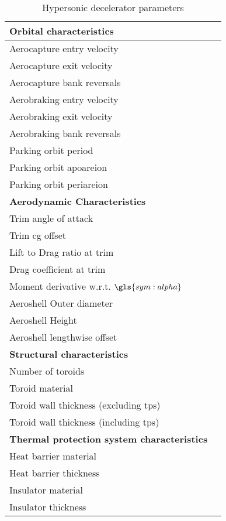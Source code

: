 \begin{table}
	\centering
	\caption{Hypersonic decelerator parameters}
	\label{tab:DeceleratorPar}
	\begin{tabular}{|l|l|} \hline
		\textbf{Orbital characteristics}             	& 			\\ \hline \hline
		Aerocapture entry velocity       				&	  		\\ \hline
		Aerocapture exit velocity				 		&     	  	\\ \hline
		Aerocapture bank reversals				        &  	   		\\ \hline
		Aerobraking entry velocity					 	&  			\\ \hline
		Aerobraking exit velocity					 	&  			\\ \hline
		Aerobraking bank reversals					 	&  			\\ \hline
		Parking orbit period						 	&  			\\ \hline
		Parking orbit apoareion			 				&  			\\ \hline
		Parking orbit periareion			 			&  			\\ \hline
		\textbf{Aerodynamic Characteristics}			&			\\ \hline \hline
		Trim angle of attack				 			&  			\\ \hline
		Trim \gls{cg} offset							&			\\ \hline
		Lift to Drag ratio at trim			 			&  			\\ \hline
		Drag coefficient at trim			 			&  			\\ \hline
		Moment derivative w.r.t. $\gls{sym:alpha}$		&  			\\ \hline
		Aeroshell Outer diameter						&  			\\ \hline
		Aeroshell Height								&  			\\ \hline
		Aeroshell lengthwise offset						&  			\\ \hline
		\textbf{Structural characteristics}				&			\\ \hline
		Number of toroids					 			&  			\\ \hline \hline
		Toroid material						 			&  			\\ \hline
		Toroid wall thickness (excluding \gls{tps})		&			\\ \hline
		Toroid wall thickness (including \gls{tps})		&			\\ \hline
		\textbf{Thermal protection system characteristics}	&		\\ \hline \hline
		Heat barrier material							&			\\ \hline
		Heat barrier thickness							&			\\ \hline
		Insulator material								&			\\ \hline
		Insulator thickness								&			\\ \hline
			
		
	\end{tabular}
\end{table}

